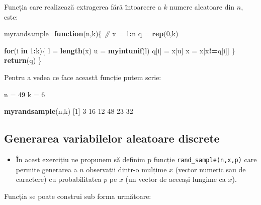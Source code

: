 \documentclass[]{article}
\newenvironment{Shaded}{\begin{snugshade}}{\end{snugshade}}
\newcommand{\KeywordTok}[1]{\textcolor[rgb]{0.13,0.29,0.53}{\textbf{#1}}}
\newcommand{\DecValTok}[1]{\textcolor[rgb]{0.00,0.00,0.81}{#1}}
\newcommand{\StringTok}[1]{\textcolor[rgb]{0.31,0.60,0.02}{#1}}
\newcommand{\CommentTok}[1]{\textcolor[rgb]{0.56,0.35,0.01}{\textit{#1}}}
\newcommand{\ControlFlowTok}[1]{\textcolor[rgb]{0.13,0.29,0.53}{\textbf{#1}}}
\newcommand{\OperatorTok}[1]{\textcolor[rgb]{0.81,0.36,0.00}{\textbf{#1}}}
\newcommand{\NormalTok}[1]{#1}
\newenvironment{frshaded*}{%
  \def\FrameCommand{\fboxrule=\FrameRule\fboxsep=\FrameSep \fcolorbox{framecolor}{shadecolor1}}%
  \MakeFramed {\advance\hsize-\width \FrameRestore}}%
{\endMakeFramed}
\newenvironment{rmdblock}[1]
  {\begin{frshaded*}
  \begin{itemize}
  \renewcommand{\labelitemi}{
    \raisebox{-.7\height}[0pt][0pt]{
      {\setkeys{Gin}{width=2em,keepaspectratio}\texttt{[image: images/icons/\#1]}}
    }
  }
  \item
  }
  {
  \end{itemize}
  \end{frshaded*}
  }
\newenvironment{rmdexercise}
  {\begin{rmdblock}{exercise}}
  {\end{rmdblock}}
\begin{document}
Funcția care realizează extragerea fără întoarcere a \(k\) numere
aleatoare din \(n\), este:

\begin{Shaded}
\begin{Highlighting}[]
\NormalTok{myrandsample=}\ControlFlowTok{function}\NormalTok{(n,k)\{}
  \CommentTok{# }
\NormalTok{  x =}\StringTok{ }\DecValTok{1}\OperatorTok{:}\NormalTok{n}
\NormalTok{  q =}\StringTok{ }\KeywordTok{rep}\NormalTok{(}\DecValTok{0}\NormalTok{,k)}
  
  \ControlFlowTok{for}\NormalTok{(i }\ControlFlowTok{in} \DecValTok{1}\OperatorTok{:}\NormalTok{k)\{}
\NormalTok{    l =}\StringTok{ }\KeywordTok{length}\NormalTok{(x)}
\NormalTok{    u =}\StringTok{ }\KeywordTok{myintunif}\NormalTok{(l)}
\NormalTok{    q[i] =}\StringTok{ }\NormalTok{x[u]}
\NormalTok{    x =}\StringTok{ }\NormalTok{x[x}\OperatorTok{!=}\NormalTok{q[i]]}
\NormalTok{  \}}
  \KeywordTok{return}\NormalTok{(q)}
\NormalTok{\}}
\end{Highlighting}
\end{Shaded}

Pentru a vedea ce face această funcție putem scrie:

\begin{Shaded}
\begin{Highlighting}[]
\NormalTok{n =}\StringTok{ }\DecValTok{49}
\NormalTok{k =}\StringTok{ }\DecValTok{6}

\KeywordTok{myrandsample}\NormalTok{(n,k)}
\NormalTok{[}\DecValTok{1}\NormalTok{]  }\DecValTok{3} \DecValTok{16} \DecValTok{12} \DecValTok{48} \DecValTok{23} \DecValTok{32}
\end{Highlighting}
\end{Shaded}

\subsection{Generarea variabilelor aleatoare
discrete}\label{generarea-variabilelor-aleatoare-discrete}

\begin{rmdexercise}
În acest exercițiu ne propunem să definim p funcție
\texttt{rand\_sample(n,x,p)} care permite generarea a \(n\) observații
dintr-o mulțime \(x\) (vector numeric sau de caractere) cu
probabilitatea \(p\) pe \(x\) (un vector de aceeași lungime ca \(x\)).
\end{rmdexercise}

Funcția se poate construi sub forma următoare:
\end{document}
